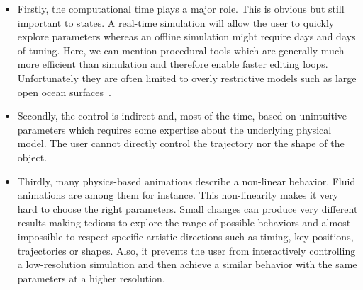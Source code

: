 \begin{itemize}
	\item Firstly, the computational time plays a major role. 
	This is obvious but still important to states. 
	A real-time simulation will allow the user to quickly explore parameters whereas an offline simulation might require days and days of tuning.
    Here, we can mention procedural tools which are generally much more efficient than simulation and therefore enable faster editing loops. Unfortunately they are often limited to overly restrictive models such as large open ocean surfaces~\cite{hinsinger2002,Tessendorf2004,jeschke2015water,horwath2015empirical}.
	\item Secondly, the control is indirect and, most of the time, based on unintuitive parameters which requires some expertise about the underlying physical model. The user cannot directly control the trajectory nor the shape of the object.
	\item Thirdly, many physics-based animations describe a non-linear behavior. Fluid animations are among them for instance. 
	This non-linearity makes it very hard to choose the right parameters. 
	Small changes can produce very different results making tedious to explore the range of possible behaviors and almost impossible to respect specific artistic directions such as timing, key positions, trajectories or shapes. 
	Also, it prevents the user from interactively controlling a low-resolution simulation and then achieve a similar behavior with the same parameters at a higher resolution.
\end{itemize}

